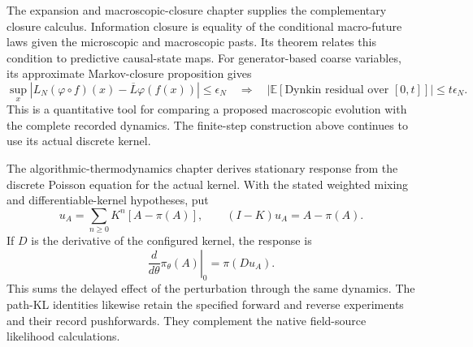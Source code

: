 \documentclass[11pt,a4paper]{article}
\begin{document}
The expansion and macroscopic-closure chapter supplies the complementary closure calculus. Information closure is equality of the conditional macro-future laws given the microscopic and macroscopic pasts. Its theorem relates this condition to predictive causal-state maps. For generator-based coarse variables, its approximate Markov-closure proposition gives
\[
\sup_x|L_N(\varphi\circ f)(x)-\overline L\varphi(f(x))|
\le\epsilon_N
\quad\Longrightarrow\quad
|\mathbb E[\text{Dynkin residual over }[0,t]]|\le t\epsilon_N.
\]
This is a quantitative tool for comparing a proposed macroscopic evolution with the complete recorded dynamics. The finite-step construction above continues to use its actual discrete kernel.

The algorithmic-thermodynamics chapter derives stationary response from the discrete Poisson equation for the actual kernel. With the stated weighted mixing and differentiable-kernel hypotheses, put
\[
u_A=\sum_{n\ge0}K^n[A-\pi(A)],\qquad (I-K)u_A=A-\pi(A).
\]
If \(D\) is the derivative of the configured kernel, the response is
\[
\left.\frac{d}{d\theta}\pi_\theta(A)\right|_{0}=\pi(Du_A).
\]
This sums the delayed effect of the perturbation through the same dynamics. The path-KL identities likewise retain the specified forward and reverse experiments and their record pushforwards. They complement the native field-source likelihood calculations.
\end{document}
